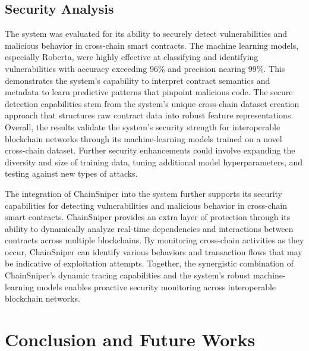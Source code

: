 \documentclass[sigconf]{acmart}
\begin{document}
\subsection{Security Analysis}
The system was evaluated for its ability to securely detect vulnerabilities and malicious behavior in cross-chain smart contracts. The machine learning models, especially Roberta, were highly effective at classifying and identifying vulnerabilities with accuracy exceeding 96\% and precision nearing 99\%. This demonstrates the system's capability to interpret contract semantics and metadata to learn predictive patterns that pinpoint malicious code. The secure detection capabilities stem from the system's unique cross-chain dataset creation approach that structures raw contract data into robust feature representations. Overall, the results validate the system's security strength for interoperable blockchain networks through its machine-learning models trained on a novel cross-chain dataset. Further security enhancements could involve expanding the diversity and size of training data, tuning additional model hyperparameters, and testing against new types of attacks.

The integration of ChainSniper into the system further supports its security capabilities for detecting vulnerabilities and malicious behavior in cross-chain smart contracts. ChainSniper provides an extra layer of protection through its ability to dynamically analyze real-time dependencies and interactions between contracts across multiple blockchains. By monitoring cross-chain activities as they occur, ChainSniper can identify various behaviors and transaction flows that may be indicative of exploitation attempts. Together, the synergistic combination of ChainSniper's dynamic tracing capabilities and the system's robust machine-learning models enables proactive security monitoring across interoperable blockchain networks. 

\section{Conclusion and Future Works}
\end{document}
